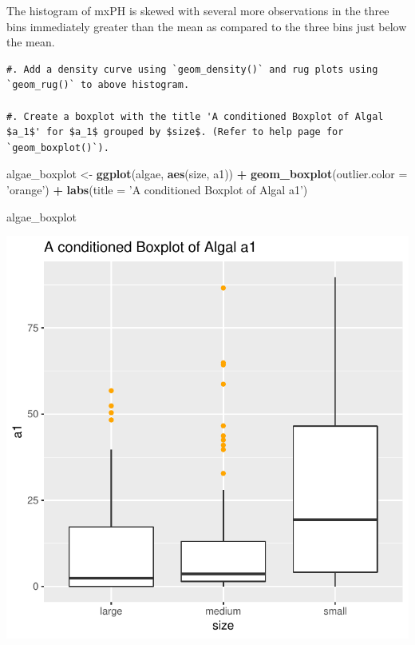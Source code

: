\documentclass[]{article}
\newenvironment{Shaded}{\begin{snugshade}}{\end{snugshade}}
\newcommand{\KeywordTok}[1]{\textcolor[rgb]{0.13,0.29,0.53}{\textbf{#1}}}
\newcommand{\DataTypeTok}[1]{\textcolor[rgb]{0.13,0.29,0.53}{#1}}
\newcommand{\StringTok}[1]{\textcolor[rgb]{0.31,0.60,0.02}{#1}}
\newcommand{\OperatorTok}[1]{\textcolor[rgb]{0.81,0.36,0.00}{\textbf{#1}}}
\newcommand{\NormalTok}[1]{#1}
\begin{document}
The histogram of mxPH is skewed with several more observations in the
three bins immediately greater than the mean as compared to the three
bins just below the mean.

\begin{verbatim}
#. Add a density curve using `geom_density()` and rug plots using `geom_rug()` to above histogram. 

#. Create a boxplot with the title 'A conditioned Boxplot of Algal $a_1$' for $a_1$ grouped by $size$. (Refer to help page for `geom_boxplot()`). 
\end{verbatim}

\begin{Shaded}
\begin{Highlighting}[]
\NormalTok{algae_boxplot <-}\StringTok{ }\KeywordTok{ggplot}\NormalTok{(algae, }\KeywordTok{aes}\NormalTok{(size, a1)) }\OperatorTok{+}
\StringTok{  }\KeywordTok{geom_boxplot}\NormalTok{(}\DataTypeTok{outlier.color =} \StringTok{'orange'}\NormalTok{) }\OperatorTok{+}
\StringTok{  }\KeywordTok{labs}\NormalTok{(}\DataTypeTok{title =} \StringTok{'A conditioned Boxplot of Algal a1'}\NormalTok{)}

\NormalTok{algae_boxplot}
\end{Highlighting}
\end{Shaded}

\begin{center}\includegraphics{homework1-handout_files/figure-latex/boxplot-1} \end{center}
\end{document}
